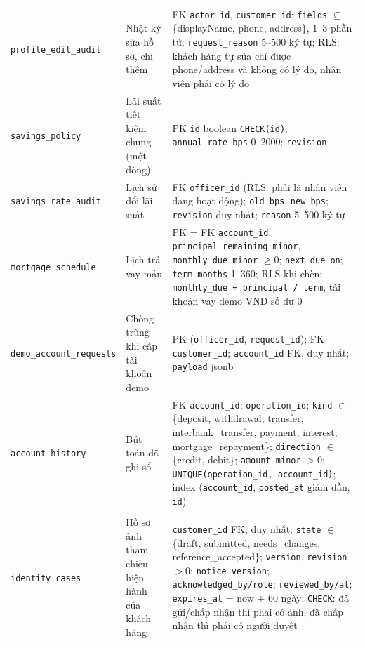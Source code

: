 {\begin{longtable}{>{\raggedright\arraybackslash}p{}>{\raggedright\arraybackslash}p{}>{\raggedright\arraybackslash}p{}}
\texttt{profile\_\allowbreak{}edit\_\allowbreak{}audit} & Nhật ký sửa hồ sơ, chỉ thêm & FK \texttt{actor\_\allowbreak{}id}, \texttt{customer\_\allowbreak{}id}; \texttt{fields} $\subseteq$ \{displayName, phone, address\}, 1--3 phần tử; \texttt{request\_\allowbreak{}reason} 5--500 ký tự; RLS: khách hàng tự sửa chỉ được phone/address và không có lý do, nhân viên phải có lý do \\
\texttt{savings\_\allowbreak{}policy} & Lãi suất tiết kiệm chung (một dòng) & PK \texttt{id} boolean \texttt{CHECK(id)}; \texttt{annual\_\allowbreak{}rate\_\allowbreak{}bps} 0--2000; \texttt{revision} \\
\texttt{savings\_\allowbreak{}rate\_\allowbreak{}audit} & Lịch sử đổi lãi suất & FK \texttt{officer\_\allowbreak{}id} (RLS: phải là nhân viên đang hoạt động); \texttt{old\_\allowbreak{}bps}, \texttt{new\_\allowbreak{}bps}; \texttt{revision} duy nhất; \texttt{reason} 5--500 ký tự \\
\texttt{mortgage\_\allowbreak{}schedule} & Lịch trả vay mẫu & PK = FK \texttt{account\_\allowbreak{}id}; \texttt{principal\_\allowbreak{}remaining\_\allowbreak{}minor}, \texttt{monthly\_\allowbreak{}due\_\allowbreak{}minor} $\geq 0$; \texttt{next\_\allowbreak{}due\_\allowbreak{}on}; \texttt{term\_\allowbreak{}months} 1--360; RLS khi chèn: \texttt{monthly\_\allowbreak{}due = principal / term}, tài khoản vay demo VND số dư 0 \\
\texttt{demo\_account\_\allowbreak requests} & Chống trùng khi cấp tài khoản demo & PK (\texttt{officer\_\allowbreak{}id}, \texttt{request\_\allowbreak{}id}); FK \texttt{customer\_\allowbreak{}id}; \texttt{account\_\allowbreak{}id} FK, duy nhất; \texttt{payload} jsonb \\
\texttt{account\_\allowbreak{}history} & Bút toán đã ghi sổ & FK \texttt{account\_\allowbreak{}id}; \texttt{operation\_\allowbreak{}id}; \texttt{kind} $\in$ \{deposit, withdrawal, transfer, interbank\_transfer, payment, interest, mortgage\_repayment\}; \texttt{direction} $\in$ \{credit, debit\}; \texttt{amount\_\allowbreak{}minor} $> 0$; \texttt{UNIQUE(operation\_\allowbreak{}id, account\_\allowbreak{}id)}; index (\texttt{account\_\allowbreak{}id}, \texttt{posted\_\allowbreak{}at} giảm dần, \texttt{id}) \\
\multicolumn{3}{l}{\textit{Ảnh tham chiếu}} \\
\texttt{identity\_\allowbreak{}cases} & Hồ sơ ảnh tham chiếu hiện hành của khách hàng & \texttt{customer\_\allowbreak{}id} FK, duy nhất; \texttt{state} $\in$ \{draft, submitted, needs\_changes, reference\_accepted\}; \texttt{version}, \texttt{revision} $> 0$; \texttt{notice\_\allowbreak{}version}; \texttt{acknowledged\_\allowbreak{}by/\allowbreak{}role}; \texttt{reviewed\_\allowbreak{}by/\allowbreak{}at}; \texttt{expires\_\allowbreak{}at} = now + 60 ngày; \texttt{CHECK}: đã gửi/chấp nhận thì phải có ảnh, đã chấp nhận thì phải có người duyệt \\

\end{longtable}}
